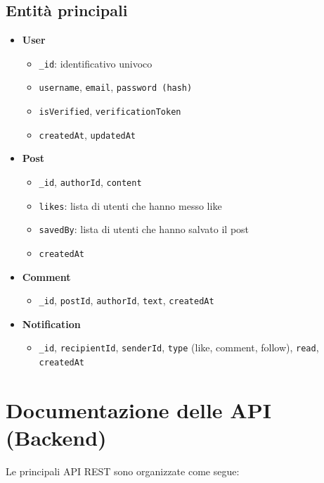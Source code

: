 \documentclass[a4paper,12pt]{article}
\begin{document}
\subsection{Entità principali}
\begin{itemize}
    \item \textbf{User}
    \begin{itemize}
        \item \texttt{\_id}: identificativo univoco
        \item \texttt{username}, \texttt{email}, \texttt{password (hash)}
        \item \texttt{isVerified}, \texttt{verificationToken}
        \item \texttt{createdAt}, \texttt{updatedAt}
    \end{itemize}

    \item \textbf{Post}
    \begin{itemize}
        \item \texttt{\_id}, \texttt{authorId}, \texttt{content}
        \item \texttt{likes}: lista di utenti che hanno messo like
        \item \texttt{savedBy}: lista di utenti che hanno salvato il post
        \item \texttt{createdAt}
    \end{itemize}

    \item \textbf{Comment}
    \begin{itemize}
        \item \texttt{\_id}, \texttt{postId}, \texttt{authorId}, \texttt{text}, \texttt{createdAt}
    \end{itemize}

    \item \textbf{Notification}
    \begin{itemize}
        \item \texttt{\_id}, \texttt{recipientId}, \texttt{senderId}, \texttt{type} (like, comment, follow), \texttt{read}, \texttt{createdAt}
    \end{itemize}
\end{itemize}

\section{Documentazione delle API (Backend)}
Le principali API REST sono organizzate come segue:
\end{document}
